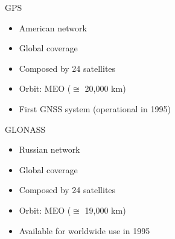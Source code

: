 \begin{frame}{GPS}

    \begin{itemize}
        \item American network
        \vspace{0.2cm}
        \item Global coverage
        \vspace{0.2cm}
        \item Composed by 24 satellites
        \vspace{0.2cm}
        \item Orbit: MEO ($\cong$ 20,000 km)
        \vspace{0.2cm}
        \item First GNSS system (operational in 1995)
    \end{itemize}

\end{frame}

\begin{frame}{GLONASS}

    \begin{itemize}
        \item Russian network
        \vspace{0.2cm}
        \item Global coverage
        \vspace{0.2cm}
        \item Composed by 24 satellites
        \vspace{0.2cm}
        \item Orbit: MEO ($\cong$ 19,000 km)
        \vspace{0.2cm}
        \item Available for worldwide use in 1995
    \end{itemize}

\end{frame}


